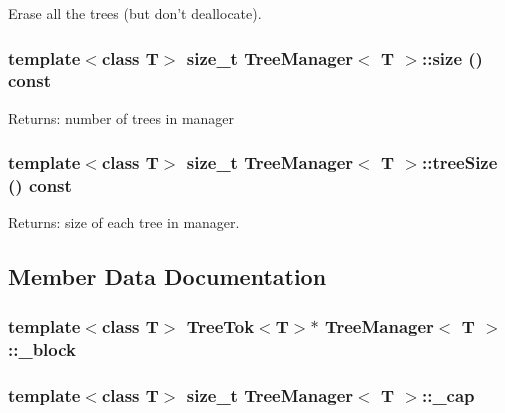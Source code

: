 Erase all the trees (but don't deallocate). 

\subsubsection{\setlength{\rightskip}{0pt plus 5cm}template$<$class T$>$ size\_\-t {\bf Tree\-Manager}$<$ T $>$::size () const\hspace{0.3cm}{\tt  [inline]}}\label{classTreeManager_a6}


\begin{Desc}
\item[Returns:]number of trees in manager \end{Desc}
\subsubsection{\setlength{\rightskip}{0pt plus 5cm}template$<$class T$>$ size\_\-t {\bf Tree\-Manager}$<$ T $>$::tree\-Size () const\hspace{0.3cm}{\tt  [inline]}}\label{classTreeManager_a4}


\begin{Desc}
\item[Returns:]size of each tree in manager. \end{Desc}


\subsection{Member Data Documentation}
\subsubsection{\setlength{\rightskip}{0pt plus 5cm}template$<$class T$>$ {\bf Tree\-Tok}$<$T$>$$\ast$ {\bf Tree\-Manager}$<$ T $>$::{\bf \_\-block}\hspace{0.3cm}{\tt  [protected]}}\label{classTreeManager_p0}


\subsubsection{\setlength{\rightskip}{0pt plus 5cm}template$<$class T$>$ size\_\-t {\bf Tree\-Manager}$<$ T $>$::{\bf \_\-cap}\hspace{0.3cm}{\tt  [protected]}}\label{classTreeManager_p3}



